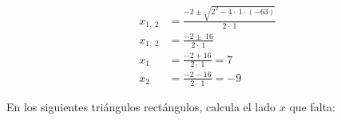 \documentclass[12pt,addpoints,answers]{evalua}
\begin{document}
\begin{questions}
\begin{multicols}{2}
\begin{parts}
            \begin{solutionbox}{5cm}
                \begin{align*}
                    x_{1,\:2} & =\frac{-2\pm \sqrt{2^2-4\cdot \:1\cdot \left(-63\right)}}{2\cdot \:1} \\
                    x_{1,\:2} & =\frac{-2\pm \:16}{2\cdot \:1}                                        \\
                    x_1       & =\frac{-2+16}{2\cdot \:1}=7                                           \\
                    x_2       & =\frac{-2-16}{2\cdot \:1}=-9
                \end{align*}
            \end{solutionbox}
        \end{parts}
    \end{multicols}

    \question[] En los siguientes triángulos rectángulos, calcula el lado $x$ que falta:
    \begin{multicols}{2}
\end{multicols}
\end{questions}
\end{document}
